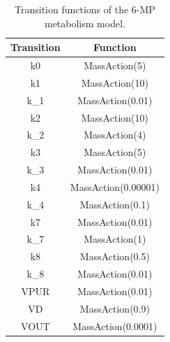 \documentclass[journal,a4paper,onecolumn]{article}
\begin{document}
\begin{table}[!hbt]
	\begin{center}
		\caption{Transition functions of the 6-MP metabolism model.}
		\label{Transition functions of 6-MP metabolism}
		\begin{tabular}{|c|c|}
			\hline
			Transition&Function\\
			\hline
			k0&MassAction(5)\\
			\hline
			k1&MassAction(10)\\
			\hline
			k\_1&MassAction(0.01)\\
			\hline
			k2&MassAction(10)\\
			\hline
			k\_2&MassAction(4)\\
			\hline
			k3&MassAction(5)\\
			\hline
			k\_3&MassAction(0.01)\\
			\hline
			k4&MassAction(0.00001)\\
			\hline
			k\_4&MassAction(0.1)\\
			\hline
			k7&MassAction(0.01)\\
			\hline
			k\_7&MassAction(1)\\
			\hline
			k8&MassAction(0.5)\\
			\hline
			k\_8&MassAction(0.01)\\
			\hline
			VPUR&MassAction(0.01)\\
			\hline
			VD&MassAction(0.9)\\
			\hline
			VOUT&MassAction(0.0001)\\
			\hline
		\end{tabular}
	\end{center}
\end{table}
\end{document}
